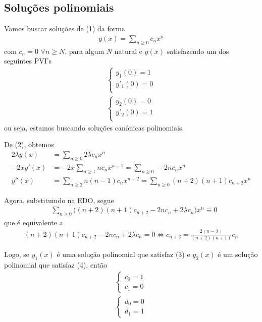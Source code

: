 \documentclass{article}
\begin{document}
\subsection{Soluções polinomiais}
\hspace{12pt} Vamos buscar soluções de (1) da forma
\begin{align}
y(x) = \sum_{n\geq 0}^{}c_n x^n
\end{align}
com $c_n = 0$ $\forall n\geq N$, para algum $N$ natural e $y(x)$ satisfazendo um dos seguintes PVI's
\begin{align}
	\begin{cases}
		y_1(0)  =  1 \\
		y'_1(0) =  0 \\
	\end{cases} \\
	\begin{cases}
		y_2(0) = 0 \\ 
		y'_2(0) = 1 \\
	\end{cases}
\end{align}
ou seja, estamos buscando soluções canônicas polinomiais. 
\par De (2), obtemos
\begin{align*}
2\lambda y(x) &= \sum_{n\geq 0}^{}2\lambda c_n x^n \\
-2xy'(x) &= -2x\sum_{n\geq 1}^{}nc_nx^{n-1} = \sum_{n\geq 0}^{}-2nc_nx^n \\
y''(x) &= \sum_{n\geq 2}^{}n(n-1)c_nx^{n-2} = \sum_{n\geq 0}^{}(n+2)(n+1)c_{n+2}x^n
\end{align*}
\par Agora, substituindo na EDO, segue
\begin{align*}
&\sum_{n\geq 0}^{}\Big((n+2)(n+1)c_{n+2} - 2nc_n + 2\lambda c_n\Big)x^n \equiv 0  
\end{align*}
que é equivalente a 
\begin{align*}
(n+2)(n+1)c_{n+2} - 2nc_n + 2\lambda c_n = 0 \Leftrightarrow c_{n+2} = \frac{2(n - \lambda)}{(n+2)(n+1)}c_n
\end{align*}
\par Logo, se $y_1(x)$ é uma solução polinomial que satisfaz (3) e $y_2(x)$ é um solução polinomial que satisfaz (4), então 
\begin{align}
\begin{cases}
c_0 = 1 \\ c_1 = 0
\end{cases} \\
\begin{cases}
d_0 = 0 \\
d_1 = 1
\end{cases}
\end{align}
\end{document}
